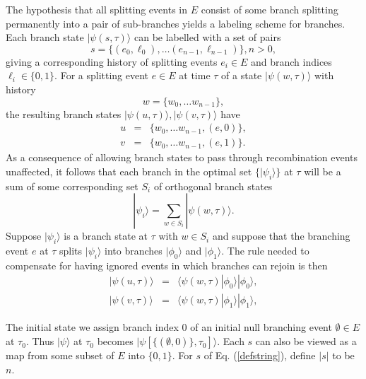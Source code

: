 \documentclass[twocolumn,amsmath,amssymb]{revtex4-1}
\begin{document}
The hypothesis that all splitting events in $E$ consist
of some branch splitting permanently into a pair of
sub-branches yields a labeling scheme for branches.
Each branch state $|\psi( s, \tau) \rangle $
can be labelled with a
set of pairs  
\begin{equation}
  \label{defstring}
  s = \{ (e_0, \ell_0),  \ldots (e_{n-1}, \ell_{n-1}) \}, n > 0,
\end{equation}  
giving a corresponding history of 
splitting events $e_i \in E$ and branch indices $ \ell_i \in \{0,1 \}$.
For a splitting event $e \in E$ at time $\tau$
of a state $|\psi(w, \tau) \rangle $ with history
\begin{equation}
      \label{defw}
      w =  \{ w_0, \ldots w_{n-1}\},
\end{equation}
the resulting branch states $|\psi(u, \tau) \rangle , |\psi(v, \tau) \rangle $
have
\begin{subequations}
  \begin{eqnarray}
    \label{defu}
    u & = & \{ w_0, \ldots w_{n-1}, (e, 0) \}, \\
    \label{defv}
    v & = & \{ w_0, \ldots w_{n-1}, (e, 1) \}.
  \end{eqnarray}
\end{subequations}
As a consequence of allowing branch states to pass through
recombination events unaffected, it follows that each
branch in the optimal set $\{ |\psi_i \rangle  \}$ at $\tau$
will be a sum of some corresponding set $S_i$ of orthogonal
branch states
\begin{equation}
  \label{truebranches}
  |\psi_i \rangle  = \sum_{w \in S_i} |\psi( w, \tau) \rangle .
\end{equation}
Suppose $|\psi_i \rangle $ is a branch state at $\tau$ with
$w \in S_i$ and suppose that the branching event $e$
at $\tau$ splits $|\psi_i \rangle $ into branches $|\phi_0 \rangle $ and $|\phi_1 \rangle $.
The rule needed to compensate for
having ignored events in which branches can rejoin
is then
\begin{subequations}
  \begin{eqnarray}
    \label{defpu}
    |\psi(u, \tau) \rangle  & = &  \langle  \psi( w, \tau) | \phi_0 \rangle  |\phi_0 \rangle , \\
    \label{defpv}
    |\psi(v, \tau) \rangle  & = &  \langle  \psi( w, \tau) | \phi_1 \rangle  |\phi_1 \rangle , 
  \end{eqnarray}
\end{subequations}


The initial state
we assign branch index 0
of an initial null branching event
$ \emptyset \in E$ at $\tau_0$.
Thus $|\psi \rangle $ at $\tau_0$ becomes
$|\psi[\{( \emptyset, 0)\}, \tau_0] \rangle $.
Each $s$ can also be viewed as a map from
some subset of $E$ into $\{0,1\}$.
For $s$ of Eq. (\ref{defstring}),
define $|s|$ to be $n$. 
\end{document}
